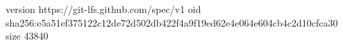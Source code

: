 version https://git-lfs.github.com/spec/v1
oid sha256:e5a51ef375122c12de72d502db422f4a9f19ed62e4e064e604cb4c2d10cfca30
size 43840
